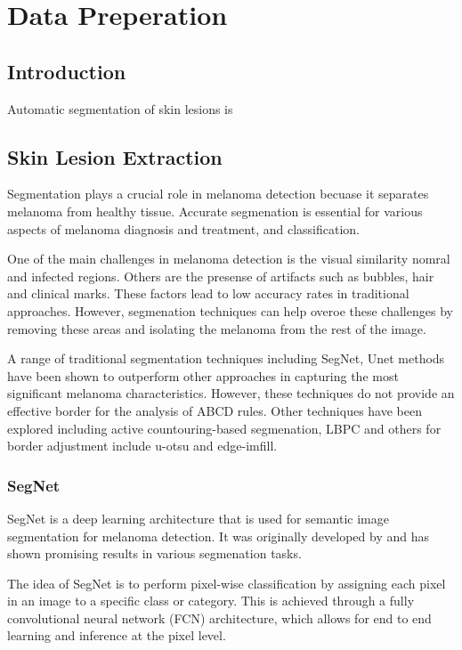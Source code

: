 \chapter{Data Preperation}

\section{Introduction}
Automatic segmentation of skin lesions is 

\section{Skin Lesion Extraction}
Segmentation plays a crucial role in melanoma detection becuase it separates melanoma from healthy tissue. Accurate segmenation is essential for various aspects of melanoma diagnosis and treatment, and classification\cite{Albahli et al., 2020}.

One of the main challenges in melanoma detection is the visual similarity nomral and infected regions. Others are the presense of artifacts such as bubbles, hair and clinical marks\cite{Albahli et al., 2020}. These factors lead to low accuracy rates in traditional approaches. However, segmenation techniques can help overoe these challenges by removing these areas and isolating the melanoma from the rest of the image.

A range of traditional segmentation techniques including SegNet, Unet methods have been shown to outperform other approaches in capturing the most significant melanoma characteristics. However, these techniques do not provide an effective border for the analysis of ABCD rules. Other techniques have been explored including active countouring-based segmenation\cite{Riaz et al., 2019}, LBPC and others for border adjustment include u-otsu and edge-imfill.


\subsection{SegNet}
SegNet is a deep learning architecture that is used for semantic image segmentation for melanoma detection. It was originally developed by\cite{  Chen et al. (2018)} and has shown promising results in various segmenation tasks.

The idea of SegNet is to perform pixel-wise classification by assigning each pixel in an image to a specific class or category. This is achieved through a fully convolutional neural network (FCN) architecture, which allows for end to end learning and inference at the pixel level. 

